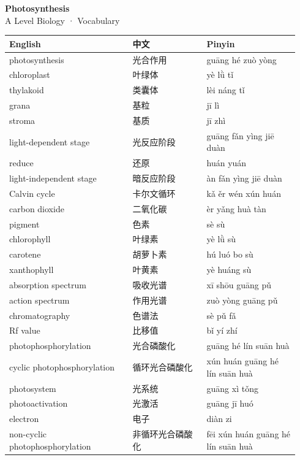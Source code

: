 \documentclass[11pt]{article}
\begin{document}
\begin{center}
  {\LARGE\bfseries Photosynthesis}\\[0.35em]
  {\large A Level Biology · Vocabulary}
\end{center}
\vspace{0.6em}

\begin{longtable}{@{}p{0.40\linewidth}p{0.24\linewidth}p{0.30\linewidth}@{}}
\toprule
\textbf{English} & \textbf{中文} & \textbf{Pinyin} \\
\midrule
\endhead
\bottomrule
\endlastfoot
photosynthesis & 光合作用 & guāng hé zuò yòng \\
chloroplast & 叶绿体 & yè lǜ tǐ \\
thylakoid & 类囊体 & lèi náng tǐ \\
grana & 基粒 & jī lì \\
stroma & 基质 & jī zhì \\
light-dependent stage & 光反应阶段 & guāng fǎn yìng jiē duàn \\
reduce & 还原 & huán yuán \\
light-independent stage & 暗反应阶段 & àn fǎn yìng jiē duàn \\
Calvin cycle & 卡尔文循环 & kǎ ěr wén xún huán \\
carbon dioxide & 二氧化碳 & èr yǎng huà tàn \\
pigment & 色素 & sè sù \\
chlorophyll & 叶绿素 & yè lǜ sù \\
carotene & 胡萝卜素 & hú luó bo sù \\
xanthophyll & 叶黄素 & yè huáng sù \\
absorption spectrum & 吸收光谱 & xī shōu guāng pǔ \\
action spectrum & 作用光谱 & zuò yòng guāng pǔ \\
chromatography & 色谱法 & sè pǔ fǎ \\
Rf value & 比移值 & bǐ yí zhí \\
photophosphorylation & 光合磷酸化 & guāng hé lín suān huà \\
cyclic photophosphorylation & 循环光合磷酸化 & xún huán guāng hé lín suān huà \\
photosystem & 光系统 & guāng xì tǒng \\
photoactivation & 光激活 & guāng jī huó \\
electron & 电子 & diàn zi \\
non-cyclic photophosphorylation & 非循环光合磷酸化 & fēi xún huán guāng hé lín suān huà \\

\end{longtable}
\end{document}
